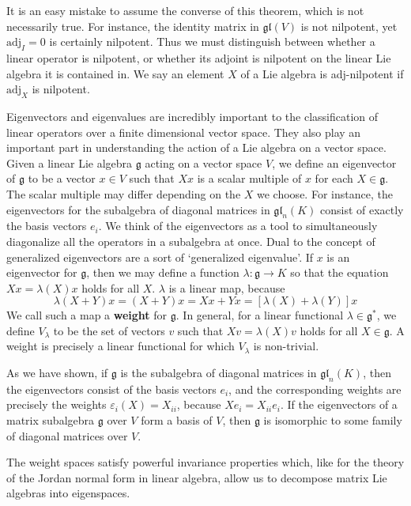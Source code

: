 It is an easy mistake to assume the converse of this theorem, which is not necessarily true. For instance, the identity matrix in $\mathfrak{gl}(V)$ is not nilpotent, yet $\text{adj}_I = 0$ is certainly nilpotent. Thus we must distinguish between whether a linear operator is nilpotent, or whether its adjoint is nilpotent on the linear Lie algebra it is contained in. We say an element $X$ of a Lie algebra is adj-nilpotent if $\text{adj}_X$ is nilpotent.

Eigenvectors and eigenvalues are incredibly important to the classification of linear operators over a finite dimensional vector space. They also play an important part in understanding the action of a Lie algebra on a vector space. Given a linear Lie algebra $\mathfrak{g}$ acting on a vector space $V$, we define an eigenvector of $\mathfrak{g}$ to be a vector $x \in V$ such that $Xx$ is a scalar multiple of $x$ for each $X \in \mathfrak{g}$. The scalar multiple may differ depending on the $X$ we choose. For instance, the eigenvectors for the subalgebra of diagonal matrices in $\mathfrak{gl}_n(K)$ consist of exactly the basis vectors $e_i$. We think of the eigenvectors as a tool to simultaneously diagonalize all the operators in a subalgebra at once. Dual to the concept of generalized eigenvectors are a sort of `generalized eigenvalue'. If $x$ is an eigenvector for $\mathfrak{g}$, then we may define a function $\lambda: \mathfrak{g} \to K$ so that the equation $Xx = \lambda(X)x$ holds for all $X$. $\lambda$ is a linear map, because
%
\[ \lambda(X + Y)x = (X + Y)x = Xx + Yx = [\lambda(X) + \lambda(Y)]x \]
%
We call such a map a {\bf weight} for $\mathfrak{g}$. In general, for a linear functional $\lambda \in \mathfrak{g}^*$, we define $V_\lambda$ to be the set of vectors $v$ such that $Xv = \lambda(X)v$ holds for all $X \in \mathfrak{g}$. A weight is precisely a linear functional for which $V_\lambda$ is non-trivial.

\begin{example}
    As we have shown, if $\mathfrak{g}$ is the subalgebra of diagonal matrices in $\mathfrak{gl}_n(K)$, then the eigenvectors consist of the basis vectors $e_i$, and the corresponding weights are precisely the weights $\varepsilon_i(X) = X_{ii}$, because $Xe_i = X_{ii} e_i$. If the eigenvectors of a matrix subalgebra $\mathfrak{g}$ over $V$ form a basis of $V$, then $\mathfrak{g}$ is isomorphic to some family of diagonal matrices over $V$.
\end{example}

The weight spaces satisfy powerful invariance properties which, like for the theory of the Jordan normal form in linear algebra, allow us to decompose matrix Lie algebras into eigenspaces.

